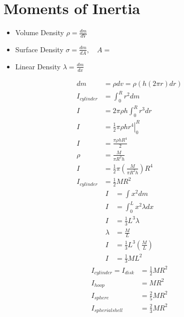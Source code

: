 \documentclass{article}
\begin{document}
\section{Moments of Inertia}

\begin{itemize}
	\item Volume Density \textrightarrow $ \rho = \frac{dm}{dV} $
	\item Surface Density \textrightarrow $ \sigma = \frac{dm}{dA}, \quad A = $ 
	\item Linear Density \textrightarrow $ \lambda = \frac{dm}{dx} $
\end{itemize}
\begin{align*}
	dm & = \rho dv = \rho(h(2\pi r)dr) \\
	I_{cylinder} & = \int_0^R r^2 dm \\
	I & = 2\pi \rho h \int_0^R r^3 dr \\
	I & = \left. \frac{1}{2}\pi \rho hr^4 \right|_0^R \\
	I & = \frac{\pi \rho hR^4}{2} \\
	\rho & = \frac{M}{\pi R^2h} \\
	I & = \frac{1}{2}\pi \left( \frac{M}{\pi R^2h} \right) R^4 \\
	I_{cylinder} & = \frac{1}{2}MR^2
\end{align*}
\begin{align*}
	I & = \int x^2 dm \\
	I & = \int_0^L x^2\lambda dx \\
	I & = \frac{1}{3}L^3\lambda \\
	\lambda & = \frac{M}{L} \\
	I & = \frac{1}{3}L^3 \left( \frac{M}{L} \right) \\
	I & = \frac{1}{3}ML^2
\end{align*}
\begin{align*}
	I_{cylinder} = I_{disk} & = \frac{1}{2}MR^2 \\
	I_{hoop} & = MR^2 \\
	I_{sphere} & = \frac{2}{5}MR^2 \\
	I_{spherial shell} & = \frac{2}{3}MR^2
\end{align*}
\end{document}
